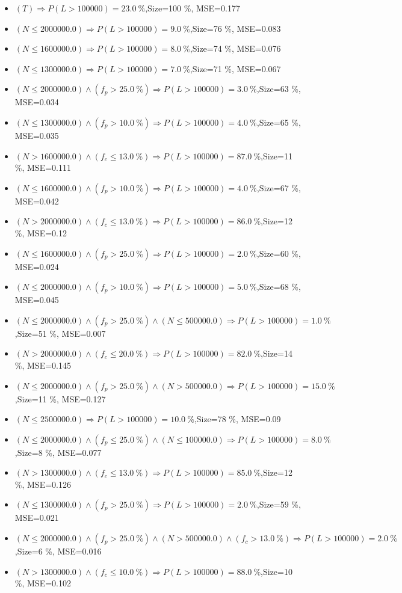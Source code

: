 \documentclass[numbered]{CSL}
\begin{document}
\begin{itemize}
\item $(T) \Rightarrow P(L > 100 000) = 23.0~\%$,\hfill Size=100 \%, MSE=0.177
\item $(N \leq 2000000.0) \Rightarrow P(L > 100 000) = 9.0~\%$,\hfill Size=76 \%, MSE=0.083
\item $(N \leq 1600000.0) \Rightarrow P(L > 100 000) = 8.0~\%$,\hfill Size=74 \%, MSE=0.076
\item $(N \leq 1300000.0) \Rightarrow P(L > 100 000) = 7.0~\%$,\hfill Size=71 \%, MSE=0.067
\item $(N \leq 2000000.0) \land (f_p > 25.0~\%) \Rightarrow P(L > 100 000) = 3.0~\%$,\hfill Size=63 \%, MSE=0.034
\item $(N \leq 1300000.0) \land (f_p > 10.0~\%) \Rightarrow P(L > 100 000) = 4.0~\%$,\hfill Size=65 \%, MSE=0.035
\item $(N > 1600000.0) \land (f_c \leq 13.0~\%) \Rightarrow P(L > 100 000) = 87.0~\%$,\hfill Size=11 \%, MSE=0.111
\item $(N \leq 1600000.0) \land (f_p > 10.0~\%) \Rightarrow P(L > 100 000) = 4.0~\%$,\hfill Size=67 \%, MSE=0.042
\item $(N > 2000000.0) \land (f_c \leq 13.0~\%) \Rightarrow P(L > 100 000) = 86.0~\%$,\hfill Size=12 \%, MSE=0.12
\item $(N \leq 1600000.0) \land (f_p > 25.0~\%) \Rightarrow P(L > 100 000) = 2.0~\%$,\hfill Size=60 \%, MSE=0.024
\item $(N \leq 2000000.0) \land (f_p > 10.0~\%) \Rightarrow P(L > 100 000) = 5.0~\%$,\hfill Size=68 \%, MSE=0.045
\item $(N \leq 2000000.0) \land (f_p > 25.0~\%) \land (N \leq 500000.0) \Rightarrow P(L > 100 000) = 1.0~\%$,\hfill Size=51 \%, MSE=0.007
\item $(N > 2000000.0) \land (f_c \leq 20.0~\%) \Rightarrow P(L > 100 000) = 82.0~\%$,\hfill Size=14 \%, MSE=0.145
\item $(N \leq 2000000.0) \land (f_p > 25.0~\%) \land (N > 500000.0) \Rightarrow P(L > 100 000) = 15.0~\%$,\hfill Size=11 \%, MSE=0.127
\item $(N \leq 2500000.0) \Rightarrow P(L > 100 000) = 10.0~\%$,\hfill Size=78 \%, MSE=0.09
\item $(N \leq 2000000.0) \land (f_p \leq 25.0~\%) \land (N \leq 100000.0) \Rightarrow P(L > 100 000) = 8.0~\%$,\hfill Size=8 \%, MSE=0.077
\item $(N > 1300000.0) \land (f_c \leq 13.0~\%) \Rightarrow P(L > 100 000) = 85.0~\%$,\hfill Size=12 \%, MSE=0.126
\item $(N \leq 1300000.0) \land (f_p > 25.0~\%) \Rightarrow P(L > 100 000) = 2.0~\%$,\hfill Size=59 \%, MSE=0.021
\item $(N \leq 2000000.0) \land (f_p > 25.0~\%) \land (N > 500000.0) \land (f_c > 13.0~\%) \Rightarrow P(L > 100 000) = 2.0~\%$,\hfill Size=6 \%, MSE=0.016
\item $(N > 1300000.0) \land (f_c \leq 10.0~\%) \Rightarrow P(L > 100 000) = 88.0~\%$,\hfill Size=10 \%, MSE=0.102
\end{itemize}
\end{document}
